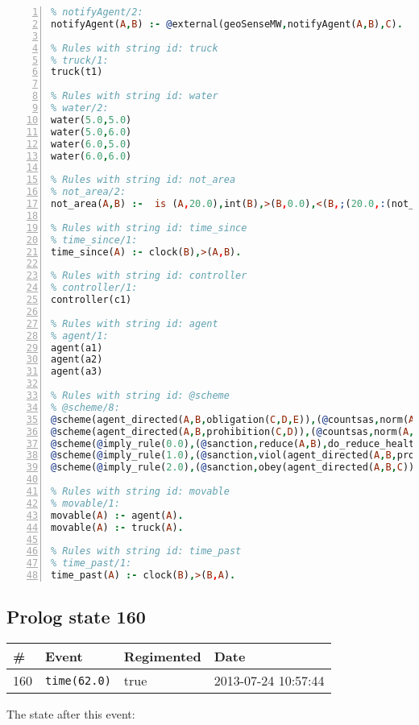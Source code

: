 \documentclass[11pt]{article}\usepackage[utf8]{inputenc}\usepackage{geometry}
\begin{document}
\begin{lstlisting}[language=Prolog, numbers=left]
% Rules with string id: notifyAgent
% notifyAgent/2:
notifyAgent(A,B) :- @external(geoSenseMW,notifyAgent(A,B),C).

% Rules with string id: truck
% truck/1:
truck(t1)

% Rules with string id: water
% water/2:
water(5.0,5.0)
water(5.0,6.0)
water(6.0,5.0)
water(6.0,6.0)

% Rules with string id: not_area
% not_area/2:
not_area(A,B) :-  is (A,20.0),int(B),>(B,0.0),<(B,;(20.0,:(not_area(A,B), is (-(B),20.0)))),int(A),>(A,0.0),<(A,;(20.0,:(area(A,B),-(int(A))))),int(B),>(A,0.0),>(B,0.0),<(A,21.0),<(B,21.0).

% Rules with string id: time_since
% time_since/1:
time_since(A) :- clock(B),>(A,B).

% Rules with string id: controller
% controller/1:
controller(c1)

% Rules with string id: agent
% agent/1:
agent(a1)
agent(a2)
agent(a3)

% Rules with string id: @scheme
% @scheme/8:
@scheme(agent_directed(A,B,obligation(C,D,E)),(@countsas,norm(A,B,F,obligation(C,D,E)),F),false,(listTrue(C)),(time_past(D)),false,[plus(viol(agent_directed(A,B,obligation(C,D,E))))|[]],[plus(obey(agent_directed(A,B,obligation(C,D,E))))|[]])
@scheme(agent_directed(A,B,prohibition(C,D)),(@countsas,norm(A,B,E,prohibition(C,D)),E),(listTrue(C)),false,(false),false,[plus(viol(agent_directed(A,B,prohibition(C,D))))|[]],[plus(obey(agent_directed(A,B,prohibition(C,D))))|[]])
@scheme(@imply_rule(0.0),(@sanction,reduce(A,B),do_reduce_health(A,B),notifyAgent(A,changed(status))),true,false,false,false,[min(reduce(A,B))|[]],[])
@scheme(@imply_rule(1.0),(@sanction,viol(agent_directed(A,B,prohibition(C,D))),do_sanction(D)),true,false,false,false,[min(viol(agent_directed(A,B,prohibition(C,D))))|[]],[])
@scheme(@imply_rule(2.0),(@sanction,obey(agent_directed(A,B,C))),true,false,false,false,[min(obey(agent_directed(A,B,C)))|[]],[])

% Rules with string id: movable
% movable/1:
movable(A) :- agent(A).
movable(A) :- truck(A).

% Rules with string id: time_past
% time_past/1:
time_past(A) :- clock(B),>(B,A).

\end{lstlisting}
\clearpage 
\subsection{Prolog state 160}
\begin{table}[ht]
\centering 
\begin{tabular}{l l l l} 
\textbf{\#} & \textbf{Event} & \textbf{Regimented} & \textbf{Date} \\ [0.5ex] 
\hline
160&\texttt{time(62.0)}&true&2013-07-24 10:57:44\\ [1ex] \hline\end{tabular}
\end{table}
The state after this event:
\end{document}
